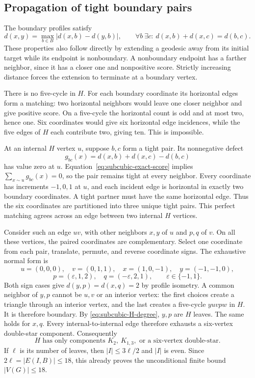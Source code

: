 \subsection{Propagation of tight boundary pairs}
The boundary profiles satisfy
\[
 d(x,y)=\max_{b\in B}|d(x,b)-d(y,b)|,
 \qquad \forall b\ \exists c:\ d(x,b)+d(x,c)=d(b,c).
\]
These properties also follow directly by extending a geodesic away from
its initial target while its endpoint is nonboundary. A nonboundary
endpoint has a farther neighbor, since it has a closer one and nonpositive
score. Strictly increasing distance forces the extension to terminate
at a boundary vertex.

There is no five-cycle in $H$. For each boundary coordinate its horizontal
edges form a matching: two horizontal neighbors would leave one closer
neighbor and give positive score. On a five-cycle the horizontal count is
odd and at most two, hence one. Six coordinates would give six horizontal
edge incidences, while the five edges of $H$ each contribute two, giving
ten. This is impossible.

At an internal $H$ vertex $u$, suppose $b,c$ form a tight pair. Its
nonnegative defect
\[
 g_{bc}(x)=d(x,b)+d(x,c)-d(b,c)
\]
has value zero at $u$. Equation~\eqref{eq:subcubic-exact-score} implies
$\sum_{x\sim u}g_{bc}(x)=0$, so the pair remains tight at every neighbor.
Every coordinate has increments $-1,0,1$ at $u$, and each incident edge is
horizontal in exactly two boundary coordinates. A tight partner must have
the same horizontal edge. Thus the six coordinates are partitioned into
three unique tight pairs. This perfect matching agrees across an edge
between two internal $H$ vertices.

Consider such an edge $uv$, with other neighbors $x,y$ of $u$ and $p,q$
of $v$. On all these vertices, the paired coordinates are complementary.
Select one coordinate from each pair, translate, permute, and reverse
coordinate signs. The exhaustive normal form is
\[
 u=(0,0,0),\quad v=(0,1,1),\quad
 x=(1,0,-1),\quad y=(-1,-1,0),
\]
\[
 p=(\varepsilon,1,2),\quad q=(-\varepsilon,2,1),
 \qquad\varepsilon\in\{-1,1\}.
\]
Both sign cases give $d(y,p)=d(x,q)=2$ by profile isometry.
A common neighbor of $y,p$ cannot be $u,v$ or an interior vertex: the
first choices create a triangle through an interior vertex, and the last
creates a five-cycle $yuvpw$ in $H$. It is therefore boundary. By
\eqref{eq:subcubic-H-degree}, $y,p$ are $H$ leaves. The same holds for $x,q$.
Every internal-to-internal edge therefore exhausts a six-vertex double-star
component. Consequently
\[
 H\text{ has only components }K_2,\ K_{1,3},\text{ or a six-vertex double-star}.
\]
If $\ell$ is its number of leaves, then $|I|\le3\ell/2$ and $|I|$ is even.
Since $2\ell=|E(I,B)|\le18$, this already proves the unconditional
finite bound $|V(G)|\le18$.

